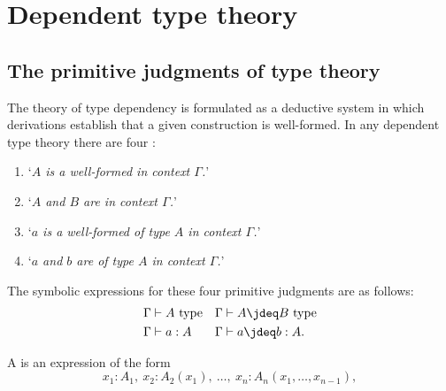 \chapter{Dependent type theory}
\label{ch:dtt}

\section{The primitive judgments of type theory}

The theory of type dependency is formulated as a deductive system in which derivations establish that a given construction is well-formed. In any dependent type theory there are four :
\begin{enumerate}
\item `\emph{$A$ is a well-formed  in context $\Gamma$.}'
\item `\emph{$A$ and $B$ are  in context $\Gamma$.}'
\item `\emph{$a$ is a well-formed  of type $A$ in context $\Gamma$.}'
\item `\emph{$a$ and $b$ are  of type $A$ in context $\Gamma$.}'
\end{enumerate}
\begin{samepage}
The symbolic expressions for these four primitive judgments are as follows:
\begin{align*}
\Gamma & \vdash A~\textrm{type} & \Gamma & \vdash A\jdeq B~\textrm{type}\\
\Gamma & \vdash a:A & \Gamma & \vdash a\jdeq b:A.
\end{align*}
\end{samepage}
A  is an expression of the form
\begin{equation*}
x_1:A_1,~x_2:A_2(x_1),~\ldots,~x_n:A_n(x_1,\ldots,x_{n-1}),
\end{equation*}
